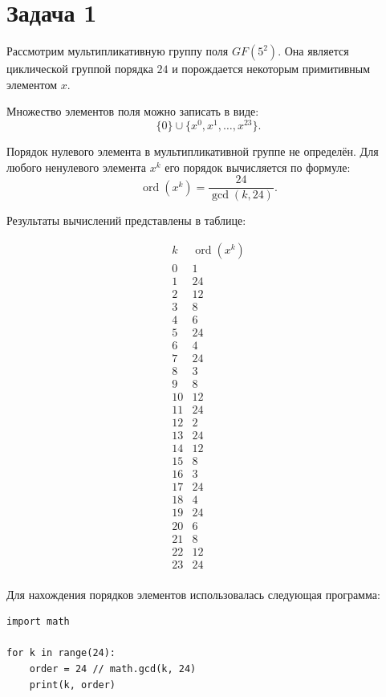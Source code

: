 \documentclass[a4paper,12pt]{article}
\begin{document}
\section*{Задача 1}

Рассмотрим мультипликативную группу поля $GF(5^2)$. Она является циклической группой порядка $24$ и порождается некоторым примитивным элементом $x$.

Множество элементов поля можно записать в виде:
\[
\{0\} \cup \{x^0, x^1, \dots, x^{23}\}.
\]

Порядок нулевого элемента в мультипликативной группе не определён. Для любого ненулевого элемента $x^k$ его порядок вычисляется по формуле:
\[
\operatorname{ord}(x^k) = \frac{24}{\gcd(k, 24)}.
\]

Результаты вычислений представлены в таблице:

\[
\begin{array}{c|c}
k & \operatorname{ord}(x^k) \\
\hline
0 & 1 \\
1 & 24 \\
2 & 12 \\
3 & 8 \\
4 & 6 \\
5 & 24 \\
6 & 4 \\
7 & 24 \\
8 & 3 \\
9 & 8 \\
10 & 12 \\
11 & 24 \\
12 & 2 \\
13 & 24 \\
14 & 12 \\
15 & 8 \\
16 & 3 \\
17 & 24 \\
18 & 4 \\
19 & 24 \\
20 & 6 \\
21 & 8 \\
22 & 12 \\
23 & 24 \\
\end{array}
\]

Для нахождения порядков элементов использовалась следующая программа:

\begin{verbatim}
import math

for k in range(24):
    order = 24 // math.gcd(k, 24)
    print(k, order)
\end{verbatim}
\end{document}
